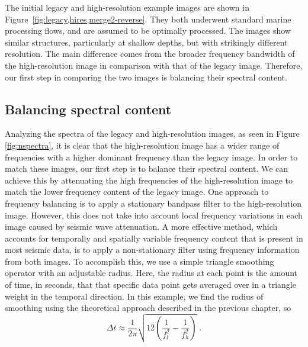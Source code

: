     The initial legacy and high-resolution example images are shown in Figure~\ref{fig:legacy,hires,merge2-reverse}. 
    They both underwent standard marine processing flows, and are assumed to be optimally processed.
    The images show similar structures, particularly at shallow depths, but with strikingly different resolution. 
    The main difference comes from the broader frequency bandwidth of the high-resolution image in comparison with that of the legacy image. 
    Therefore, our first step in comparing the two images is balancing their spectral content.

\subsection{Balancing spectral content}

    Analyzing the spectra of the legacy and high-resolution images, as seen in Figure \ref{fig:nspectra}, it is clear that the high-resolution image has a wider range of frequencies with a higher dominant frequency than the legacy image. 
    In order to match these images, our first step is to balance their spectral content. 
    We can achieve this by attenuating the high frequencies of the high-resolution image to match the lower frequency content of the legacy image. 
    One approach to frequency balancing is to apply a stationary bandpass filter to the high-resolution image. 
    However, this does not take into account local frequency variations in each image caused by seismic wave attenuation.
    A more effective method, which accounts for temporally and spatially variable frequency content that is present in most seismic data, is to apply a non-stationary filter using frequency information from both images. 
    To accomplish this, we use a simple triangle smoothing operator with an adjustable radius. 
    Here, the radius at each point is the amount of time, in seconds, that that specific data point gets averaged over in a triangle weight in the temporal direction.
    In this example, we find the radius of smoothing using the theoretical approach described in the previous chapter, so 
    \begin{equation}
        \label{eq:rad}
        \Delta t \approx \frac{1}{2\pi}\sqrt{12\left(\frac{1}{f_{l}^{2}}-\frac{1}{f_{h}^{2}}\right)}\;.
    \end{equation}
